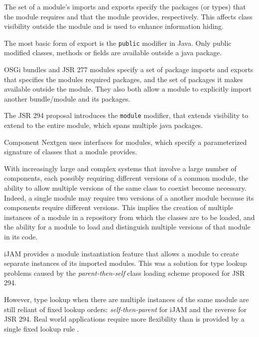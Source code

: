 
The set of a module's imports and exports specify the packages (or types) that
the module requires and that the module provides, respectively. This affects class
visibility outside the module and is used to enhance information hiding. 

The most basic form of export is the {\tt public} modifier in Java. Only
public modified classes, methods or fields are available outside a java package.

OSGi bundles and JSR 277 modules specify a set of package imports 
and exports that specifies the modules required packages, and the set of packages 
it makes available outside the module. They also both allow a module
to explicitly import another bundle/module and its packages.

The JSR 294\cite{JSR294} proposal introduces the {\tt module} modifier, that
extends visibility to extend to the entire module, which spans multiple java
packages.

Component Nextgen \cite{componentnextgen} uses interfaces for modules, which
specify a parameterized signature of classes that a module provides.

With increasingly large and complex systems that involve a large number of components,
each possibly requiring different versions of a common module,
the ability to allow multiple versions of the same class to coexist become necessary.
Indeed, a single module may require two versions of a another module because its
components require different versions. This implies the creation of multiple instances 
of a module in a repository from which the classes are to be loaded, and the ability
for a module to load and distinguish multiple versions of that module in its code.

iJAM \cite{iJAM} provides a module instantiation feature that allows a module to create
separate instances of its imported modules. This was a solution for type lookup
problems caused by the {\it parent-then-self} class loading scheme proposed for
JSR 294.

However, type lookup when there are multiple instances of the same module are still
reliant of fixed lookup orders: {\it self-then-parent} for iJAM and the reverse for JSR 294.
Real world applications require more flexibility than is provided by a single fixed
lookup rule \cite{iJAMComments}.